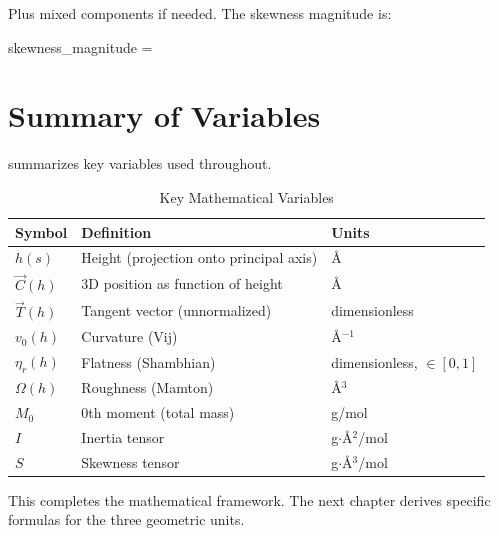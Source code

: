 Plus mixed components if needed. The skewness magnitude is:

\begin{beq}{skewness_magnitude}
    \Omega = 
\end{beq}

\section{Summary of Variables}

 summarizes key variables used throughout.

\begin{table}[h]
    \centering
    \caption{Key Mathematical Variables}
    \begin{tabularx}{\textwidth}{lXl}
        \toprule
        \textbf{Symbol} & \textbf{Definition} & \textbf{Units} \\
        \midrule
        $h(s)$ & Height (projection onto principal axis) & \AA \\
        $\vec{C}(h)$ & 3D position as function of height & \AA \\
        $\vec{T}(h)$ & Tangent vector (unnormalized) & dimensionless \\
        $v_0(h)$ & Curvature (Vij) & \AA$^{-1}$ \\
        $\eta_r(h)$ & Flatness (Shambhian) & dimensionless, $\in [0,1]$ \\
        $\Omega(h)$ & Roughness (Mamton) & \AA$^3$ \\
        $M_0$ & 0th moment (total mass) & g/mol \\
        $I$ & Inertia tensor & g$\cdot$\AA$^2$/mol \\
        $S$ & Skewness tensor & g$\cdot$\AA$^3$/mol \\
        \bottomrule
    \end{tabularx}
\end{table}

This completes the mathematical framework. The next chapter derives specific formulas for the three geometric units.
